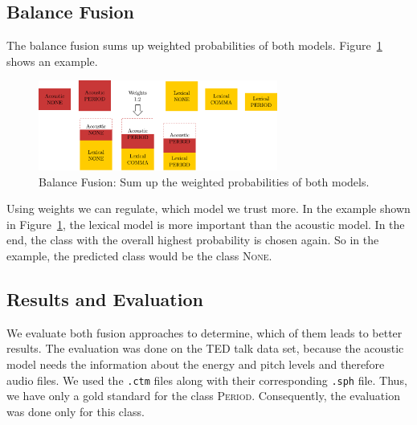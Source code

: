 \subsection{Balance Fusion}
The balance fusion sums up weighted probabilities of both models.
Figure~\ref{fig:fusion_2} shows an example.
\begin{figure}[ht]
    \centering
    \includegraphics[width=0.7\textwidth]{img/fusion_2.pdf}
    \caption{Balance Fusion: Sum up the weighted probabilities of both models.}
    \label{fig:fusion_2}
\end{figure}
Using weights we can regulate, which model we trust more.
In the example shown in Figure~\ref{fig:fusion_2}, the lexical model is more important than the acoustic model.
In the end, the class with the overall highest probability is chosen again.
So in the example, the predicted class would be the class \textsc{None}.

\subsection{Results and Evaluation}
We evaluate both fusion approaches to determine, which of them leads to better results.
The evaluation was done on the TED talk data set, because the acoustic model needs the information about the energy and pitch levels and therefore audio files.
We used the \texttt{.ctm} files along with their corresponding \texttt{.sph} file.
Thus, we have only a gold standard for the class \textsc{Period}.
Consequently, the evaluation was done only for this class.

